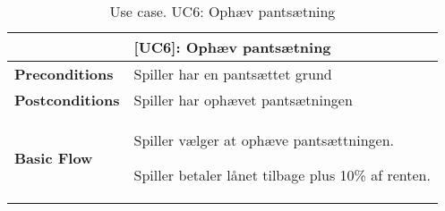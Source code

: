 \documentclass[class=article, crop=false]{standalone}
\begin{document}
    \begin{table}[H]
        \caption{Use case. UC6: Ophæv pantsætning}
        \begin{tabularx}{\textwidth}{|l|X|}
            \hline
            & \textbf{[UC6]: Ophæv pantsætning}   \\ \hline
            \textbf{Preconditions}       & Spiller har en pantsættet grund\\ \hline
            \textbf{Postconditions}      & Spiller har ophævet pantsætningen\\ \hline


            \textbf{Basic Flow} & \begin{tabenum}
                                      \item Spiller vælger at ophæve pantsættningen.
                                      \item Spiller betaler lånet tilbage plus 10\% af renten.
            \end{tabenum}   \\ \hline



        \end{tabularx}


    \end{table}
\end{document}
